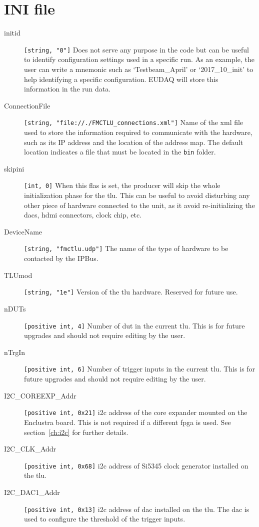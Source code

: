 \section{INI file}
\begin{description}
  \item[initid] \verb|[string, "0"]| Does not serve any purpose in the code but can be useful to identify configuration settings used in a specific run. As an example, the user can write a mnemonic such as `Testbeam\_April' or `2017\_10\_init' to help identifying a specific configuration. EUDAQ will store this information in the run data.
  \item[ConnectionFile] \verb|[string, "file://./FMCTLU_connections.xml"]| Name of the xml file used to store the information required to communicate with the hardware, such as its IP address and the location of the address map. The default location indicates a file that must be located in the \texttt{bin} folder.
  \item[skipini] \verb|[int, 0]| When this flas is set, the producer will skip the whole initialization phase for the \gls{tlu}. This can be useful to avoid disturbing any other piece of hardware connected to the unit, as it avoid re-initializing the \gls{dac}s, \gls{hdmi} connectors, clock chip, etc.
  \item[DeviceName] \verb|[string, "fmctlu.udp"]| The name of the type of hardware to be contacted by the IPBus.
  \item[TLUmod] \verb|[string, "1e"]| Version of the \gls{tlu} hardware. Reserved for future use.
  \item[nDUTs] \verb|[positive int, 4]| Number of \gls{dut} in the current \gls{tlu}. This is for future upgrades and should not require editing by the user.
  \item[nTrgIn] \verb|[positive int, 6]| Number of trigger inputs in the current \gls{tlu}. This is for future upgrades and should not require editing by the user.
  \item[I2C\_COREEXP\_Addr] \verb|[positive int, 0x21]| \gls{i2c} address of the core expander mounted on the Enclustra board. This is not required if a different \gls{fpga} is used. See section~\ref{ch:i2c} for further details.
  \item[I2C\_CLK\_Addr] \verb|[positive int, 0x68]| \gls{i2c} address of Si5345 clock generator installed on the \gls{tlu}.
  \item[I2C\_DAC1\_Addr] \verb|[positive int, 0x13]| \gls{i2c} address of \gls{dac} installed on the \gls{tlu}. The \gls{dac} is used to configure the threshold of the trigger inputs.

\end{description}
